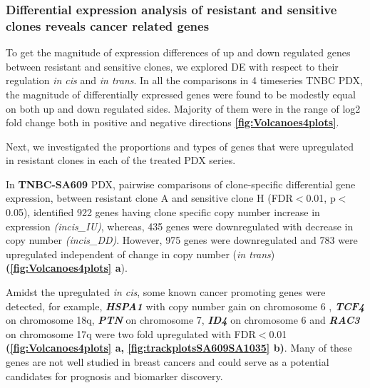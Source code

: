 
















\subsubsection{Differential expression analysis of resistant and sensitive clones reveals cancer related genes}
 
 To get the magnitude of expression differences of up and down regulated genes between resistant and sensitive clones, we explored \ac{DE} with respect to their regulation \textit{in cis} and \textit{in trans}. In all the comparisons in 4 timeseries TNBC PDX, the magnitude of differentially expressed genes were found to be modestly equal on both up and down regulated sides. Majority of them were in the range of log2 fold change both in positive and negative directions \textbf{\autoref{fig:Volcanoes4plots}}.
 
 Next, we investigated the proportions and types of genes that were upregulated in resistant clones in each of the treated PDX series.
 
 In \textbf{TNBC-SA609} PDX, pairwise comparisons of clone-specific differential gene expression, between resistant clone A and sensitive clone H (FDR$<$0.01, p$<$0.05), identified 922 genes having clone specific copy number increase in expression \textit{(incis\_IU)}, whereas, 435 genes were downregulated with decrease in copy number \textit{(incis\_DD)}. However, 975 genes were downregulated and 783 were upregulated independent of change in copy number (\textit{in trans}) \textbf{(\autoref{fig:Volcanoes4plots} a}). 
 
Amidst the upregulated \textit{in cis}, some known cancer promoting genes were detected, for example, \textit{\textbf{HSPA1}} \cite{zoppino2018comprehensive} with copy number gain on chromosome 6 , \textit{\textbf{TCF4}} \cite{ravindranath2011wnt} on chromosome 18q, %
\textit{\textbf{PTN}} \cite{huang2018chemotherapy} on chromosome 7,        
\textit{\textbf{ID4}} \cite{donzelli2018expression} on chromosome 6 and  
\textit{\textbf{RAC3}} \cite{donnelly2017rac3} on chromosome 17q were two fold upregulated with FDR$<$0.01 \textbf{(\autoref{fig:Volcanoes4plots} a, \autoref{fig:trackplotsSA609SA1035} b)}. Many of these genes are not well studied in breast cancers and could serve as a potential candidates for prognosis and biomarker discovery.

